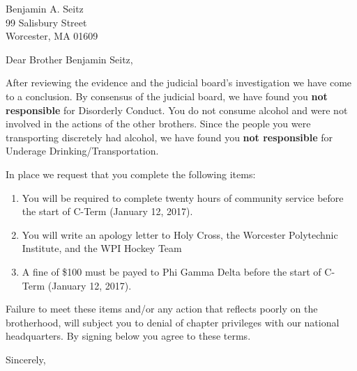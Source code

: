 \documentclass[11pt]{brownletter}
\date{November 27, 2016} %
\begin{document}
\begin{letter}{Benjamin A. Seitz\\
               99 Salisbury Street\\ 
               Worcester, MA 01609}

\opening{Dear Brother Benjamin Seitz,}

After reviewing the evidence and the judicial board's investigation we have come to a conclusion. By consensus of the judicial board, we have found you \textbf{not responsible} for Disorderly Conduct. You do not consume alcohol and were not involved in the actions of the other brothers. Since the people you were transporting discretely had alcohol, we have found you \textbf{not responsible} for Underage Drinking/Transportation. 

In place we request that you complete the following items:
\begin{enumerate}
\item You will be required to complete twenty hours of community service before the start of C-Term (January 12, 2017).
\item You will write an apology letter to Holy Cross, the Worcester Polytechnic Institute, and the WPI Hockey Team
\item A fine of \$100 must be payed to Phi Gamma Delta before the start of C-Term (January 12, 2017).
\end{enumerate}

Failure to meet these items and/or any action that reflects poorly on the brotherhood, will subject you to denial of chapter privileges with our national headquarters. By signing below you agree to these terms.

\vspace{0.5cm}

\closing{Sincerely,}



\end{letter}
\end{document}

